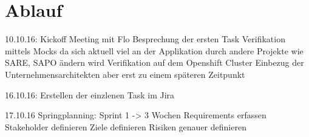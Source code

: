 \section{Ablauf}

10.10.16:
Kickoff Meeting mit Flo
Besprechung der ersten Task
Verifikation mittels Mocks da sich aktuell viel an der Applikation durch andere Projekte wie SARE, SAPO ändern wird
Verifikation auf dem Openshift Cluster
Einbezug der Unternehmensarchitekten aber erst zu einem späteren Zeitpunkt

16.10.16:
Erstellen der einzlenen Task im Jira

17.10.16
Springplanning:
Sprint 1 -> 3 Wochen
Requirements erfassen
Stakeholder definieren
Ziele definieren
Risiken genauer definieren
 